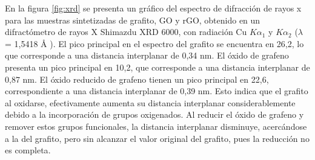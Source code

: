 En la figura \ref{fig:xrd} se presenta un gráfico del espectro de difracción de rayos x para las muestras sintetizadas de grafito, GO y rGO, obtenido en un difractómetro de rayos X Shimazdu XRD 6000, con radiación Cu $K\alpha_1$ y $K\alpha_2$ ($\lambda$ = 1,5418 \AA{} ). El pico principal en el espectro del grafito se encuentra en 26,2\degree, lo que corresponde a una distancia interplanar de 0,34 nm. El óxido de grafeno presenta un pico principal en 10,2\degree, que corresponde a una distancia interplanar de 0,87 nm. El óxido reducido de grafeno tienen un pico principal en 22,6\degree, correspondiente a una distancia interplanar de 0,39 nm. Esto indica que el grafito al oxidarse, efectivamente aumenta su distancia interplanar considerablemente debido a la incorporación de grupos oxigenados. Al reducir el óxido de grafeno y remover estos grupos funcionales, la distancia interplanar disminuye, acercándose a la del grafito, pero sin alcanzar el valor original del grafito, pues la reducción no es completa\citep{Guo2009, Marcano2010, Park2011, Li2014, Stobinski2014, Xu2014a, Yang2014, Abdolhosseinzadeh2015}.

